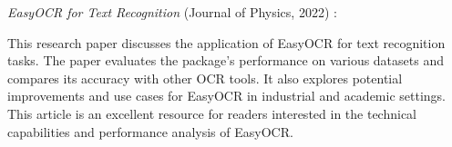 \textit{EasyOCR for Text Recognition} (Journal of Physics, 2022) \cite{Salehudinanalysis:2023}:

This research paper discusses the application of EasyOCR for text recognition tasks. The paper evaluates the package's performance on various datasets and compares its accuracy with other OCR tools. It also explores potential improvements and use cases for EasyOCR in industrial and academic settings. This article is an excellent resource for readers interested in the technical capabilities and performance analysis of EasyOCR.


